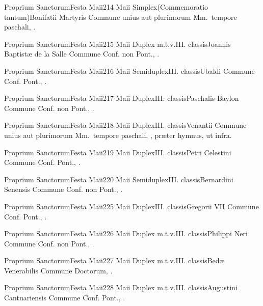 \documentclass[nocturnale-romanum.tex]{subfiles}
\begin{document}
	{Proprium Sanctorum}{Festa Maii}{2}{14 Maii}
	{Simplex}{(Commemoratio tantum)}{Bonifatii Martyris}
	{Commune unius aut plurimorum Mm.\ tempore paschali, \pageref{M-MRTP}.}
	{}

	{Proprium Sanctorum}{Festa Maii}{2}{15 Maii}
	{Duplex m.t.v.}{III. classis}{Joannis Baptistæ de la Salle}
	{Commune Conf. non Pont., \pageref{M-CONP}.}
	{}

	{Proprium Sanctorum}{Festa Maii}{2}{16 Maii}
	{Semiduplex}{III. classis}{Ubaldi}
	{Commune Conf. Pont., \pageref{M-COPO}.}
	{}

	{Proprium Sanctorum}{Festa Maii}{2}{17 Maii}
	{Duplex}{III. classis}{Paschalis Baylon}
	{Commune Conf. non Pont., \pageref{M-CONP}.}
	{}

	{Proprium Sanctorum}{Festa Maii}{2}{18 Maii}
	{Duplex}{III. classis}{Venantii}
	{Commune unius aut plurimorum Mm.\ tempore paschali, \pageref{M-MRTP}, præter hymnus, ut infra.}
	{}

	{Proprium Sanctorum}{Festa Maii}{2}{19 Maii}
	{Duplex}{III. classis}{Petri Celestini}
	{Commune Conf. Pont., \pageref{M-COPO}.}
	{}

	{Proprium Sanctorum}{Festa Maii}{2}{20 Maii}
	{Semiduplex}{III. classis}{Bernardini Senensis}
	{Commune Conf. non Pont., \pageref{M-CONP}.}
	{}

	{Proprium Sanctorum}{Festa Maii}{2}{25 Maii}
	{Duplex}{III. classis}{Gregorii VII}
	{Commune Conf. Pont., \pageref{M-COPO}.}
	{}

	{Proprium Sanctorum}{Festa Maii}{2}{26 Maii}
	{Duplex m.t.v.}{III. classis}{Philippi Neri}
	{Commune Conf. non Pont., \pageref{M-CONP}.}
	{}

	{Proprium Sanctorum}{Festa Maii}{2}{27 Maii}
	{Duplex m.t.v.}{III. classis}{Bedæ Venerabilis}
	{Commune Doctorum, \pageref{M-CODO}.}
	{}

	{Proprium Sanctorum}{Festa Maii}{2}{28 Maii}
	{Duplex m.t.v.}{III. classis}{Augustini Cantuariensis}
	{Commune Conf. Pont., \pageref{M-COPO}.}
	{}
\end{document}
